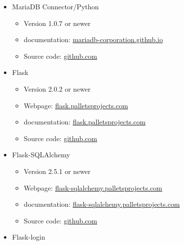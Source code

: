 \documentclass{scrreprt}
\begin{document}
\begin{itemize}
\begin{itemize}
\begin{itemize}
        \end{itemize}

        \item \gls{MariaDB} Connector/\gls{Python}
        \begin{itemize}

            \item Version 1.0.7 or newer
            \item \Gls{documentation}: \href{https://mariadb-corporation.github.io/mariadb-connector-python/}{mariadb-corporation.github.io}
            \item Source code: \href{https://github.com/mariadb-corporation/mariadb-connector-python}{github.com}

        \end{itemize}

        \item \gls{Flask}
        \begin{itemize}

            \item Version 2.0.2 or newer
            \item Webpage: \href{https://flask.palletsprojects.com/en/2.0.x/}{flask.palletsprojects.com}
            \item \Gls{documentation}: \href{https://flask.palletsprojects.com/en/2.0.x/api/}{flask.palletsprojects.com}
            \item Source code: \href{https://github.com/pallets/flask}{github.com}

        \end{itemize}
        
        \item \gls{Flask}-SQLAlchemy
        \begin{itemize}
        
        	\item Version 2.5.1 or newer
        	\item Webpage: \href{https://flask-sqlalchemy.palletsprojects.com/en/2.x/}{flask-sqlalchemy.palletsprojects.com}
        	\item \Gls{documentation}: \href{https://flask-sqlalchemy.palletsprojects.com/en/2.x/api/}{flask-sqlalchemy.palletsprojects.com}
        	\item Source code: \href{https://github.com/pallets/flask-sqlalchemy}{github.com}
        
        \end{itemize}
        
        \item \gls{Flask}-login
        \begin{itemize}
        

\end{itemize}
\end{itemize}
\end{itemize}
\end{document}
